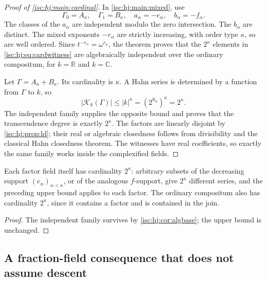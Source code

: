 \documentclass[11pt,letterpaper]{article}
\newtheorem{corollary}[theorem]{Corollary}
\theoremstyle{definition}
\theoremstyle{remark}
\newcommand{\R}{\mathbb R}
\newcommand{\C}{\mathbb C}
\newcommand{\K}[2]{\mathcal K_{#1}(#2)}
\numberwithin{equation}{section}
\begin{document}
\begin{proof}[Proof of \cref{isc:hj:main:cardinal}]
In \cref{isc:hj:main:mixed}, use
\[
 \Gamma_0=A_\kappa,\quad\Gamma_1=B_\kappa,\quad
 a_\alpha=-e_\alpha,\quad b_\alpha=-f_\alpha.
\]
The classes of the $a_\alpha$ are independent modulo the zero
intersection. The $b_\alpha$ are distinct. The mixed exponents
$-r_\alpha$ are strictly increasing, with order type $\kappa$, so are
well ordered. Since $t^{-r_\alpha}=\omega^{r_\alpha}$, the theorem
proves that the $2^\kappa$ elements in \eqref{isc:hj:eq:cardwitness} are
algebraically independent over the ordinary compositum, for $k=\R$ and
$k=\C$.

Let $\Gamma=A_\kappa+B_\kappa$. Its cardinality is $\kappa$.
A Hahn series is determined by a function from $\Gamma$ to $k$, so
\[
 |\K{k}{\Gamma}|
 \leq |k|^\kappa
 =(2^{\aleph_0})^\kappa=2^\kappa.
\]
The independent family supplies the opposite bound and proves that the
transcendence degree is exactly $2^\kappa$.
The factors are linearly disjoint by \cref{isc:hj:prop:ld}; their real or
algebraic closedness follows from divisibility and the classical Hahn
closedness theorem. The witnesses have real coefficients, so exactly the
same family works inside the complexified fields.
\end{proof}

Each factor field itself has cardinality $2^\kappa$: arbitrary subsets of
the decreasing support $(e_\alpha)_{\alpha<\kappa}$, or of the analogous
$f$-support, give $2^\kappa$ different series, and the preceding upper
bound applies to each factor. The ordinary compositum also has cardinality
$2^\kappa$, since it contains a factor and is contained in the join.

\begin{proof}
The independent family survives by \cref{isc:hj:cor:algbase}; the upper
bound is unchanged.
\end{proof}

\subsection{A fraction-field consequence that does not assume descent}
\label{isc:hj:sec:arithmetic}
\end{document}
